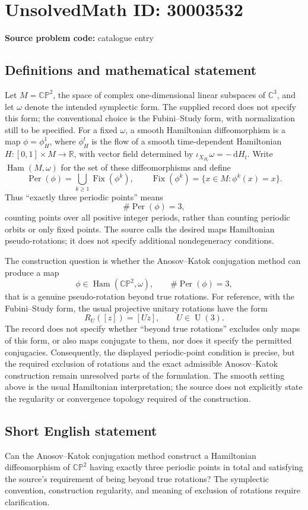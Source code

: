 \documentclass[11pt]{article}
\newcommand{\R}{\mathbb{R}}
\newcommand{\C}{\mathbb{C}}
\newcommand{\dd}{\,\mathrm{d}}
\begin{document}
\section*{UnsolvedMath ID: 30003532}
\textbf{Source problem code:} catalogue entry
\subsection{Definitions and mathematical statement}
Let \(M=\mathbb{CP}^{2}\), the space of complex one-dimensional linear subspaces of \(\C^{3}\), and let \(\omega\) denote the intended symplectic form. The supplied record does not specify this form; the conventional choice is the Fubini--Study form, with normalization still to be specified. For a fixed \(\omega\), a smooth Hamiltonian diffeomorphism is a map \(\phi=\phi_H^1\), where \(\phi_H^t\) is the flow of a smooth time-dependent Hamiltonian \(H\colon[0,1]\times M\to\R\), with vector field determined by \(\iota_{X_{H_t}}\omega=-\dd H_t\). Write \(\operatorname{Ham}(M,\omega)\) for the set of these diffeomorphisms and define
\[
\operatorname{Per}(\phi)=\bigcup_{k\geq1}\operatorname{Fix}(\phi^k),\qquad
\operatorname{Fix}(\phi^k)=\{x\in M:\phi^k(x)=x\}.
\]
Thus ``exactly three periodic points'' means
\[
\#\operatorname{Per}(\phi)=3,
\]
counting points over all positive integer periods, rather than counting periodic orbits or only fixed points. The source calls the desired maps Hamiltonian pseudo-rotations; it does not specify additional nondegeneracy conditions.

The construction question is whether the Anosov--Katok conjugation method can produce a map
\[
\phi\in\operatorname{Ham}(\mathbb{CP}^{2},\omega),\qquad \#\operatorname{Per}(\phi)=3,
\]
that is a genuine pseudo-rotation beyond true rotations. For reference, with the Fubini--Study form, the usual projective unitary rotations have the form
\[
R_U([z])=[Uz],\qquad U\in\operatorname{U}(3).
\]
The record does not specify whether ``beyond true rotations'' excludes only maps of this form, or also maps conjugate to them, nor does it specify the permitted conjugacies. Consequently, the displayed periodic-point condition is precise, but the required exclusion of rotations and the exact admissible Anosov--Katok construction remain unresolved parts of the formulation. The smooth setting above is the usual Hamiltonian interpretation; the source does not explicitly state the regularity or convergence topology required of the construction.
\subsection{Short English statement}
Can the Anosov--Katok conjugation method construct a Hamiltonian diffeomorphism of \(\mathbb{CP}^{2}\) having exactly three periodic points in total and satisfying the source's requirement of being beyond true rotations? The symplectic convention, construction regularity, and meaning of exclusion of rotations require clarification.
\end{document}
